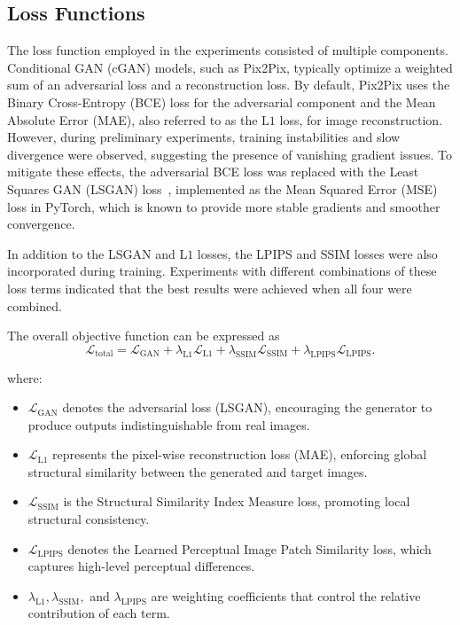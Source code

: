 \subsection{Loss Functions}
\label{subsec:losses}
The loss function employed in the experiments consisted of multiple components. Conditional GAN (cGAN) models, such as Pix2Pix, typically optimize a weighted sum of an adversarial loss and a reconstruction loss. By default, Pix2Pix uses the Binary Cross-Entropy (BCE) loss for the adversarial component and the Mean Absolute Error (MAE), also referred to as the $\mathrm{L1}$ loss, for image reconstruction. However, during preliminary experiments, training instabilities and slow divergence were observed, suggesting the presence of vanishing gradient issues. To mitigate these effects, the adversarial BCE loss was replaced with the Least Squares GAN (LSGAN) loss~\cite{ls_gan}, implemented as the Mean Squared Error (MSE) loss in PyTorch, which is known to provide more stable gradients and smoother convergence.

In addition to the LSGAN and $\mathrm{L1}$ losses, the LPIPS and SSIM losses were also incorporated during training. Experiments with different combinations of these loss terms indicated that the best results were achieved when all four were combined. 

The overall objective function can be expressed as
\begin{equation}
\mathcal{L}_{\text{total}} =
\mathcal{L}_{\text{GAN}} +
\lambda_{\text{L1}} \mathcal{L}_{\text{L1}} +
\lambda_{\text{SSIM}} \mathcal{L}_{\text{SSIM}} +
\lambda_{\text{LPIPS}} \mathcal{L}_{\text{LPIPS}}.
\end{equation}

where:
\begin{itemize}
    \item $\mathcal{L}_{\text{GAN}}$ denotes the adversarial loss (LSGAN), encouraging the generator to produce outputs indistinguishable from real images. 
    \item $\mathcal{L}_{\text{L1}}$ represents the pixel-wise reconstruction loss (MAE), enforcing global structural similarity between the generated and target images.
    \item $\mathcal{L}_{\text{SSIM}}$ is the Structural Similarity Index Measure loss, promoting local structural consistency.
    \item $\mathcal{L}_{\text{LPIPS}}$ denotes the Learned Perceptual Image Patch Similarity loss, which captures high-level perceptual differences.
    \item $\lambda_{\text{L1}}, \lambda_{\text{SSIM}},$ and $\lambda_{\text{LPIPS}}$ are weighting coefficients that control the relative contribution of each term.
\end{itemize}

